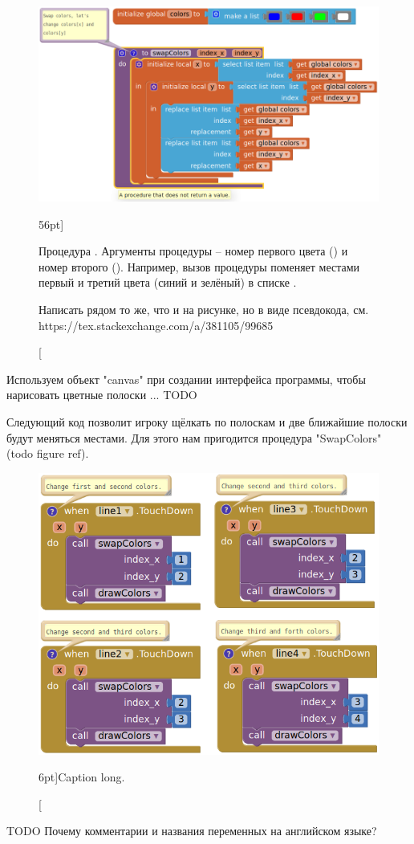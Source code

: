 \begin{figure}
  \includegraphics{./graphics/programs/change_flags/proc_swap_colors_2018.png}
    \caption[Процедура .][56pt]{Процедура .
    Аргументы процедуры -- номер первого цвета () 
    и номер второго (). 
    Например, вызов процедуры  поменяет местами первый и 
    третий цвета (синий и зелёный) в списке . 
    
    {\tiny Написать рядом то же, что и на рисунке, но в виде псевдокода, 
    см. https://tex.stackexchange.com/a/381105/99685
    }
    
    }
  \label{fig:block:proc:swap:colors}
\end{figure}

Используем объект "canvas" при создании интерфейса программы, чтобы нарисовать 
цветные полоски ... TODO

Следующий код позволит игроку щёлкать по полоскам 
и две ближайшие полоски будут меняться местами. 
Для этого нам пригодится процедура "SwapColors" (todo figure ref). 

\begin{figure}
  \includegraphics{./graphics/programs/change_flags/click_and_swap_colors_2018.png}
    \caption[Caption short.][6pt]{Caption long.
    }
  \label{fig:block:click:swap:colors}
\end{figure}

TODO Почему комментарии и названия переменных на английском языке?
